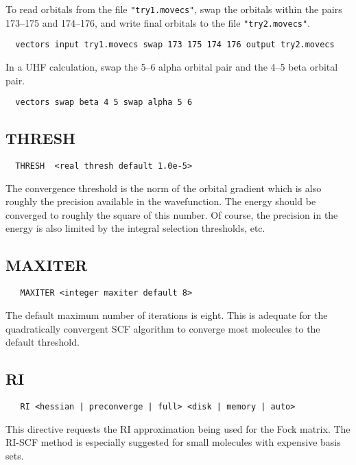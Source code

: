 \fussy

To read orbitals from the file \verb+"try1.movecs"+, swap the orbitals
within the pairs 173--175 and 174--176, and write final orbitals to
the file \verb+"try2.movecs"+.
\begin{verbatim}
  vectors input try1.movecs swap 173 175 174 176 output try2.movecs
\end{verbatim}

In a UHF calculation, swap the 5--6 alpha orbital pair and the 4--5
beta orbital pair.
\begin{verbatim}
  vectors swap beta 4 5 swap alpha 5 6
\end{verbatim}


\subsection{THRESH}

\begin{verbatim}
  THRESH  <real thresh default 1.0e-5>
\end{verbatim}

The convergence threshold is the norm of the orbital gradient which is
also roughly the precision available in the wavefunction.  The energy
should be converged to roughly the square of this number.  Of course,
the precision in the energy is also limited by the integral selection
thresholds, etc. 

\subsection{MAXITER}

\begin{verbatim}
   MAXITER <integer maxiter default 8>
\end{verbatim}

The default maximum number of iterations is eight.  This is adequate for
the quadratically convergent SCF algorithm to converge most molecules
to the default threshold.

\subsection{RI}

\begin{verbatim}
   RI <hessian | preconverge | full> <disk | memory | auto>
\end{verbatim}

This directive requests the RI approximation being used for the Fock matrix.
The RI-SCF method is especially suggested for small molecules with
expensive basis sets.

